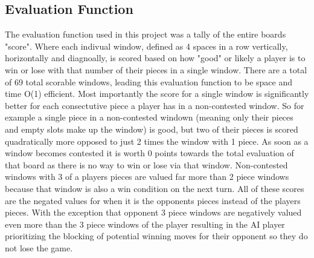 \documentclass[conference]{IEEEtran}
\begin{document}
\subsection{Evaluation Function}
The evaluation function used in this project was a tally of the entire boards "score". Where each indivual window, defined as 4 spaces in a row vertically, horizontally and diagnoally, is scored based on how "good" or likely a player is to win or lose with that number of their pieces in a single window. There are a total of 69 total scorable windows, leading this evaluation function to be space and time O(1) efficient. Most importantly the score for a single window is significantly better for each consectutive piece a player has in a non-contested window. So for example a single piece in a non-contested windown (meaning only their pieces and empty slots make up the window) is good, but two of their pieces is scored quadratically more opposed to just 2 times the window with 1 piece. As soon as a window becomes contested it is worth 0 points towards the total evaluation of that board as there is no way to win or lose via that window. Non-contested windows with 3 of a players pieces are valued far more than 2 piece windows because that window is also a win condition on the next turn. All of these scores are the negated values for when it is the opponents pieces instead of the players pieces. With the exception that opponent 3 piece windows are negatively valued even more than the 3 piece windows of the player resulting in the AI player prioritizing the blocking of potential winning moves for their opponent so they do not lose the game.
\end{document}
